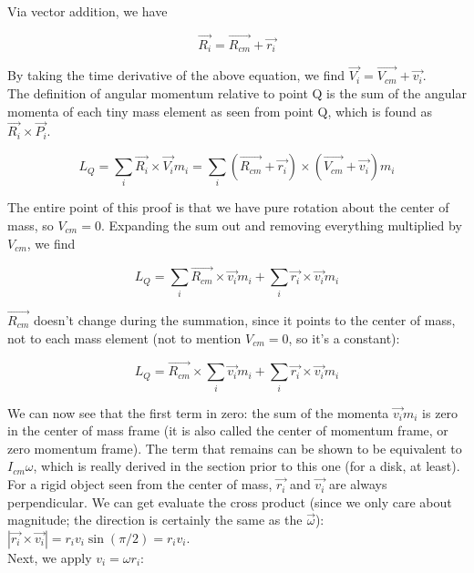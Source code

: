 \documentclass[8.01x]{subfiles}
\begin{document}
Via vector addition, we have

\begin{equation}
\vec{R_i} = \vec{R_{cm}} + \vec{r_i}
\end{equation}

By taking the time derivative of the above equation, we find $\vec{V_i} = \vec{V_{cm}} + \vec{v_i}$.\\
The definition of angular momentum relative to point Q is the sum of the angular momenta of each tiny mass element as seen from point Q, which is found as $\vec{R_i} \times \vec{P_i}$.

\begin{equation}
L_Q = \sum_i \vec{R_i} \times \vec{V_i} m_i = \sum_i (\vec{R_{cm}} + \vec{r_i}) \times (\vec{V_{cm}} + \vec{v_i}) m_i
\end{equation}

The entire point of this proof is that we have pure rotation about the center of mass, so $V_{cm} = 0$. Expanding the sum out and removing everything multiplied by $V_{cm}$, we find

\begin{equation}
L_Q = \sum_i \vec{R_{cm}} \times \vec{v_i} m_i + \sum_i \vec{r_i} \times \vec{v_i} m_i
\end{equation}

$\vec{R_{cm}}$ doesn't change during the summation, since it points to the center of mass, not to each mass element (not to mention $V_{cm} = 0$, so it's a constant):

\begin{equation}
L_Q = \vec{R_{cm}} \times \sum_i \vec{v_i} m_i + \sum_i \vec{r_i} \times \vec{v_i} m_i
\end{equation}

We can now see that the first term in zero: the sum of the momenta $\vec{v_i} m_i$ is zero in the center of mass frame (it is also called the center of momentum frame, or zero momentum frame). The term that remains can be shown to be equivalent to $I_{cm} \omega$, which is really derived in the section prior to this one (for a disk, at least).\\ 
For a rigid object seen from the center of mass, $\vec{r_i}$ and $\vec{v_i}$ are always perpendicular. We can get evaluate the cross product (since we only care about magnitude; the direction is certainly the same as the $\vec{\omega}$): $|\vec{r_i} \times \vec{v_i}| = r_i v_i \sin (\pi/2) = r_i v_i$.\\
Next, we apply $v_i = \omega r_i$:
\end{document}
